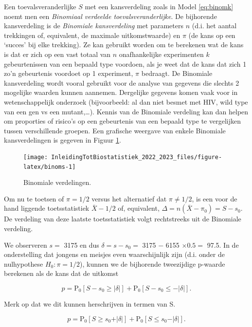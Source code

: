 \documentclass[
  12pt,dutch,coursenotes]{book}
\begin{document}
Een toevalsveranderlijke \(S\) met een kansverdeling zoals in Model \eqref{eq:binomk} noemt men een \emph{Binomiaal verdeelde toevalsveranderlijke}. De bijhorende kansverdeling is de \emph{Binomiale kansverdeling} met
parameters \(n\) (d.i. het aantal trekkingen of, equivalent, de maximale
uitkomstwaarde) en \(\pi\) (de kans op een `succes' bij elke trekking). Ze
kan gebruikt worden om te berekenen wat de kans is dat er zich op een vast
totaal van \(n\) onafhankelijke experimenten \(k\) gebeurtenissen van een
bepaald type voordoen, als je weet dat de kans dat zich 1 zo'n gebeurtenis
voordoet op 1 experiment, \(\pi\) bedraagt. De Binomiale kansverdeling wordt
vooral gebruikt voor de analyse van gegevens die slechts 2
mogelijke waarden kunnen aannemen.
Dergelijke gegevens komen vaak voor in wetenschappelijk onderzoek (bijvoorbeeld: al dan niet besmet met HIV, wild type van een gen vs een mutant,\ldots).
Kennis van de Binomiale verdeling kan dan helpen om proporties of risico's
op een gebeurtenis van een bepaald type te vergelijken tussen verschillende
groepen. Een grafische weergave van enkele Binomiale kansverdelingen is
gegeven in Figuur \ref{fig:binoms}.

\begin{figure}

{\centering \texttt{[image: InleidingTotBiostatistiek\_2022\_2023\_files/figure-latex/binoms-1]} 

}

\caption{Binomiale verdelingen.}\label{fig:binoms}
\end{figure}

Om nu te toetsen of \(\pi=1/2\) versus het alternatief dat \(\pi\neq 1/2\), is een
voor de hand liggende toetsstatistiek \(\bar X-1/2\) of, equivalent, \(\Delta=n(\bar X-\pi_0)=S-s_0\). De verdeling van deze laatste toetsstatistiek volgt
rechtstreeks uit de Binomiale verdeling.

We observeren \(s=\) 3175 en dus \(\delta=s-s_0=\) 3175 \(-\) 6155 \(\times 0.5=\) 97.5.
In de onderstelling dat jongens en meisjes even waarschijnlijk zijn (d.i. onder de nulhypothese \(H_0:\pi=1/2\)), kunnen we de bijhorende tweezijdige p-waarde berekenen als de kans dat de uitkomst

\[p=\text{P}_0\left[S-s_0\geq \vert \delta\vert \right] + \text{P}_0\left[S-s_0\leq - \vert \delta\vert \right].\]

Merk op dat we dit kunnen herschrijven in termen van S.

\[p=\text{P}_0\left[S\geq s_0+ \vert \delta\vert \right] + \text{P}_0\left[S \leq s_0 - \vert \delta\vert \right].\]
\end{document}
